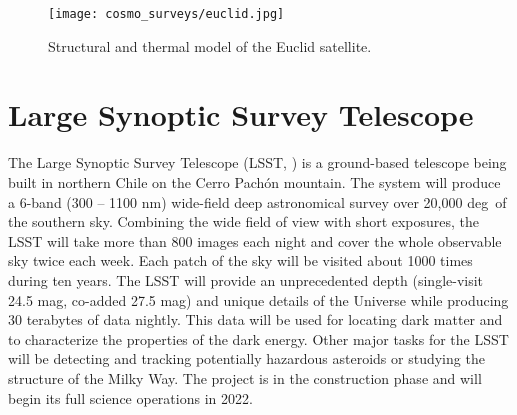 \begin{figure}[ht]
    \centering
    \texttt{[image: cosmo\_surveys/euclid.jpg]}
    \caption{Structural and thermal model of the Euclid satellite.}
    \label{fig:euclid}
\end{figure}

\section{Large Synoptic Survey Telescope}

The Large Synoptic Survey Telescope (LSST, \cite{lsst}) is a ground-based telescope being built in northern Chile on the Cerro Pach\'{o}n mountain. The system will produce a 6-band (300 -- 1100 nm) wide-field deep astronomical survey over 20,000 deg\sq\ of the southern sky. Combining the wide field of view with short exposures, the LSST will take more than 800 images each night and cover the whole observable sky twice each week. Each patch of the sky will be visited about 1000 times during ten years. The LSST will provide an unprecedented depth (single-visit 24.5 mag, co-added 27.5 mag) and unique details of the Universe while producing 30 terabytes of data nightly. This data will be used for locating dark matter and to characterize the properties of the dark energy. Other major tasks for the LSST will be detecting and tracking potentially hazardous asteroids or studying the structure of the Milky Way. The project is in the construction phase and will begin its full science operations in 2022.

